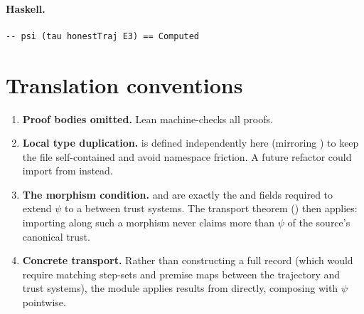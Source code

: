 \documentclass[11pt,a4paper]{article}
\begin{document}
\paragraph{Haskell.}
\begin{lstlisting}[style=haskell]
-- psi (tau honestTraj E3) == Computed
\end{lstlisting}

\section{Translation conventions}

\begin{enumerate}
\item \textbf{Proof bodies omitted.}  Lean machine-checks all proofs.

\item \textbf{Local type duplication.}   is defined
  independently here (mirroring ) to keep the
  file self-contained and avoid namespace friction.  A future refactor could
  import from  instead.

\item \textbf{The morphism condition.}   and 
  are exactly the  and  fields required to
  extend $\psi$ to a  between trust systems.  The transport theorem
  () then applies: importing along such a morphism never
  claims more than $\psi$ of the source's canonical trust.

\item \textbf{Concrete transport.}  Rather than constructing a full
   record (which would require matching step-sets and premise maps
  between the trajectory and trust systems), the module applies results from
   directly, composing with $\psi$ pointwise.
\end{enumerate}
\end{document}
